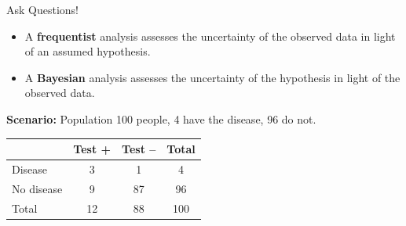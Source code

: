\documentclass[12pt]{beamer}
\newcommand{\vocab}[1]{\textcolor{AggieMaroon}{\textbf{#1}}}
\begin{document}
\begin{frame}{}
\begin{block}{Ask Questions!}
\begin{itemize}
\item A \vocab{frequentist} analysis assesses the uncertainty of the observed data in light of an assumed hypothesis.
\item A \vocab{Bayesian} analysis assesses the uncertainty of the hypothesis in light of the observed data.
\end{itemize}
\end{block}

\vspace{.2cm}

\vocab{Scenario:} Population 100 people, 4 have the disease, 96 do not.
        \begin{center}
        \begin{tabular}{lccc}
        \hline
         & \vocab{Test +} & \vocab{Test --} & \vocab{Total} \\
        \hline
        Disease & 3 & 1 & 4 \\
        No disease & 9 & 87 & 96 \\
        \hline
        Total & 12 & 88 & 100 \\
        \hline
        \end{tabular}
        \end{center}
\end{frame}
\end{document}
